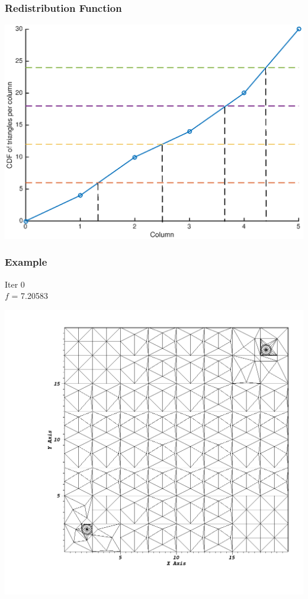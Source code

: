 \documentclass[compress]{beamer}
\begin{document}
\begin{frame}[t]\frametitle{Redistribution Function}
\centering
\includegraphics[scale = 0.5]{figures/after_redistribute.eps}
\end{frame}

\begin{frame}[t]\frametitle{Example}
\begin{minipage}{0.15\textwidth}
\begin{footnotesize}
Iter 0 \\
$f$ = 7.20583 
\end{footnotesize}
\end{minipage}
\begin{minipage}{0.8\textwidth}
\centering
\includegraphics[scale = 0.22]{figures/redistribute_before.png}
\end{minipage}
\end{frame}
\end{document}
